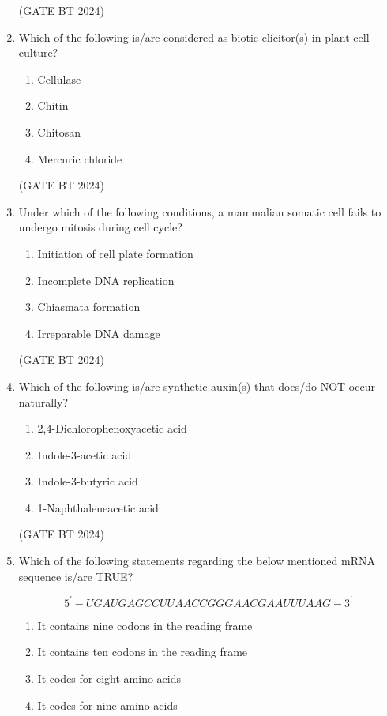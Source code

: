 \documentclass[journal,12pt,onecolumn]{IEEEtran}
\theoremstyle{remark}
\begin{document}
\begin{enumerate}
\hfill (GATE BT 2024)

\item Which of the following is/are considered as biotic elicitor(s) in plant cell culture?

\begin{enumerate}
\item Cellulase 
\item Chitin 
\item Chitosan 
\item Mercuric chloride
\end{enumerate}

\hfill (GATE BT 2024)

\item Under which of the following conditions, a mammalian somatic cell fails to undergo mitosis during cell cycle?

\begin{enumerate}
\item Initiation of cell plate formation 
\item Incomplete DNA replication 
\item Chiasmata formation 
\item Irreparable DNA damage
\end{enumerate}

\hfill (GATE BT 2024)

\item Which of the following is/are synthetic auxin(s) that does/do NOT occur naturally?

\begin{enumerate}
\item 2,4-Dichlorophenoxyacetic acid 
\item Indole-3-acetic acid 
\item Indole-3-butyric acid 
\item 1-Naphthaleneacetic acid
\end{enumerate}

\hfill (GATE BT 2024)

\item Which of the following statements regarding the below mentioned mRNA sequence is/are TRUE? 

\[
5^\prime-UGAUGAGCCUUAACCGGGAACGAAUUUAAG-3^\prime
\]

\begin{enumerate}
\item It contains nine codons in the reading frame \hfill
\item It contains ten codons in the reading frame \hfill
\item It codes for eight amino acids \hfill
\item It codes for nine amino acids
\end{enumerate}


\end{enumerate}
\end{document}
